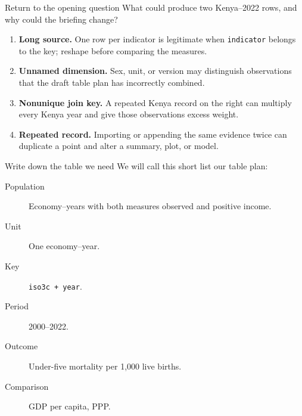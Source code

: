 \begin{frame}{Return to the opening question}
  What could produce two Kenya--2022 rows, and why could the briefing change?

  \vspace{0.4em}
  \begin{enumerate}
    \item<1-> \textbf{Long source.} One row per indicator is legitimate when
      \texttt{indicator} belongs to the key; reshape before comparing the measures.
    \item<2-> \textbf{Unnamed dimension.} Sex, unit, or version may distinguish
      observations that the draft table plan has incorrectly combined.
    \item<3-> \textbf{Nonunique join key.} A repeated Kenya record on the right
      can multiply every Kenya year and give those observations excess weight.
    \item<4-> \textbf{Repeated record.} Importing or appending the same evidence
      twice can duplicate a point and alter a summary, plot, or model.
  \end{enumerate}

  \vfill
\end{frame}

\begin{frame}{Write down the table we need}
  We will call this short list our \alert{table plan}:

  \vspace{0.25em}
  \begin{description}
    \item[Population] Economy--years with both measures observed and positive income.
    \item[Unit] One economy--year.
    \item[Key] \texttt{iso3c + year}.
    \item[Period] 2000--2022.
    \item[Outcome] Under-five mortality per 1,000 live births.
    \item[Comparison] GDP per capita, PPP.
  \end{description}
\end{frame}

